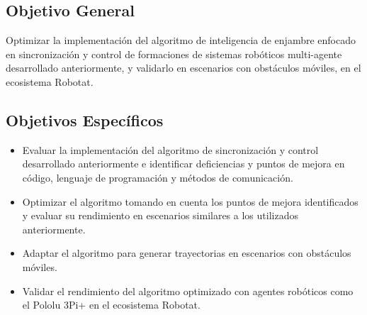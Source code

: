 \subsection*{Objetivo General}
Optimizar la implementación del algoritmo de inteligencia de enjambre enfocado en sincronización y control de formaciones de sistemas robóticos multi-agente desarrollado anteriormente, y validarlo en escenarios con obstáculos móviles, en el ecosistema Robotat.

\subsection*{Objetivos Específicos}

\begin{itemize}
	\item Evaluar la implementación del algoritmo de sincronización y control desarrollado anteriormente e identificar deficiencias y puntos de mejora en código, lenguaje de programación y métodos de comunicación.
	
	\item Optimizar el algoritmo tomando en cuenta los puntos de mejora identificados y evaluar su rendimiento en escenarios similares a los utilizados anteriormente.
	
	\item Adaptar el algoritmo para generar trayectorias en escenarios con obstáculos móviles.
	
	\item Validar el rendimiento del algoritmo optimizado con agentes robóticos como el Pololu 3Pi+ en el ecosistema Robotat.
\end{itemize}
